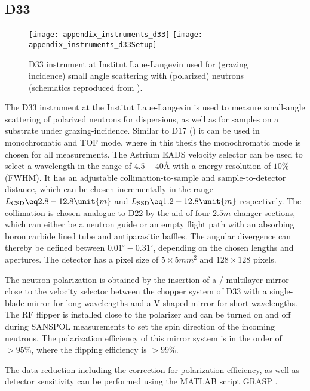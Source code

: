 \documentclass[\main/dresen_thesis.tex]{subfiles}
\begin{document}
  \subsection{D33}\label{ch:lss:d33}
    \begin{figure}[ht]
      \centering
      \texttt{[image: appendix\_instruments\_d33]}
      \texttt{[image: appendix\_instruments\_d33Setup]}
      \caption{\label{fig:lss:d33}D33 instrument at Institut Laue-Langevin used for (grazing incidence) small angle scattering with (polarized) neutrons (schematics reproduced from \cite{Dewhurst_2015_Thesm}).}
    \end{figure}
    The D33 instrument \cite{Dewhurst_2015_Thesm} at the Institut Laue-Langevin is used to measure small-angle scattering of polarized neutrons for dispersions, as well as for samples on a substrate under grazing-incidence.
    Similar to D17 () it can be used in monochromatic and TOF mode, where in this thesis the monochromatic mode is chosen for all measurements.
    The Astrium EADS velocity selector can be used to select a wavelength in the range of $4.5 - 40 \unit{\angstrom}$ with a energy resolution of $10 \unit{\%}$ (FWHM).
    It has an adjustable collimation-to-sample and sample-to-detector distance, which can be chosen incrementally in the range $L_\mathrm{CSD} \eq 2.8 - 12.8 \unit{m}$ and $L_\mathrm{SSD} \eq 1.2 - 12.8 \unit{m}$ respectively.
    The collimation is chosen analogue to D22 by the aid of four $2.5 \unit{m}$ changer sections, which can either be a neutron guide or an empty flight path with an absorbing boron carbide lined tube and antiparasitic baffles.
    The angular divergence can thereby be defined between $0.01^\circ - 0.31^\circ$, depending on the chosen lengths and apertures.
    The detector has a pixel size of $5 \times 5 \unit{mm^2}$ and $128 \times 128$ pixels.

    The neutron polarization is obtained by the insertion of a / multilayer mirror close to the velocity selector between the chopper system of D33 with a single-blade mirror for long wavelengths and a V-shaped mirror for short wavelengths.
    The RF flipper is installed close to the polarizer and can be turned on and off during SANSPOL measurements to set the spin direction of the incoming neutrons.
    The polarization efficiency of this mirror system is in the order of $>95 \unit{\%}$, where the flipping efficiency is $>99 \unit{\%}$.

    The data reduction including the correction for polarization efficiency, as well as detector sensitivity can be performed using the MATLAB script GRASP \cite{Dewhurst_2003_Grasp}.
\end{document}
